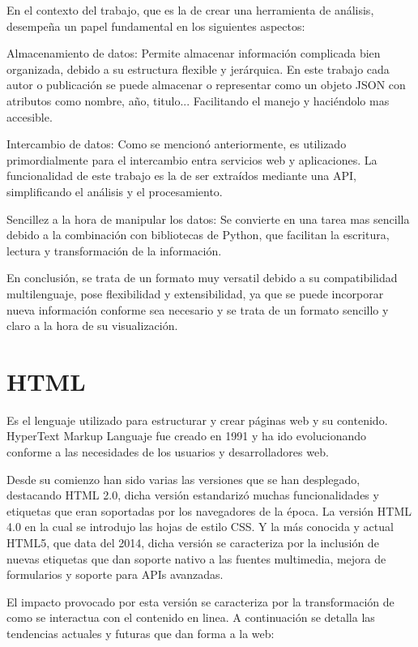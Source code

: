 \documentclass[a4paper, 12pt]{book}
\begin{document}
En el contexto del trabajo, que es la de crear una herramienta de análisis, desempeña un papel fundamental en los siguientes aspectos:

Almacenamiento de datos: Permite almacenar información complicada bien organizada, debido a su estructura flexible y jerárquica. En este trabajo cada autor o publicación se puede almacenar o representar como un objeto JSON con atributos como nombre, año, titulo... Facilitando el manejo y haciéndolo mas accesible.

Intercambio de datos: Como se mencionó anteriormente, es utilizado primordialmente para el intercambio entra servicios web y aplicaciones. La funcionalidad de este trabajo es la de ser extraídos mediante una API, simplificando el análisis y el procesamiento.

Sencillez a la hora de manipular los datos: Se convierte en una tarea mas sencilla debido a la combinación con bibliotecas de Python, que facilitan la escritura, lectura y transformación de la información. 

En conclusión, se trata de un formato muy versatil debido a su compatibilidad multilenguaje, pose flexibilidad y extensibilidad, ya que se puede incorporar nueva información conforme sea necesario y se trata de un formato sencillo y claro a la hora de su visualización.


\section{HTML}

Es el lenguaje utilizado para estructurar y crear páginas web y su contenido. HyperText Markup Languaje fue creado en 1991 y ha ido evolucionando conforme a las necesidades de los usuarios y desarrolladores web.

Desde su comienzo han sido varias las versiones que se han desplegado, destacando HTML 2.0, dicha versión estandarizó muchas funcionalidades y etiquetas que eran soportadas por los navegadores de la época. La versión HTML 4.0 en la cual se introdujo las hojas de estilo CSS. Y la más conocida y actual HTML5, que data del 2014, dicha versión se caracteriza por la inclusión de nuevas etiquetas que dan soporte nativo a las fuentes multimedia, mejora de formularios y soporte para APIs avanzadas.

El impacto provocado por esta versión se caracteriza por la transformación de como se interactua con el contenido en linea. A continuación se detalla las tendencias actuales y futuras que dan forma a la web:
\end{document}
